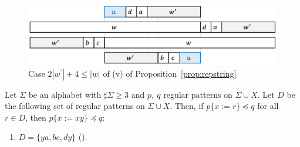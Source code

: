 \begin{figure}[t]
\begin{center}
  \includegraphics[scale=0.345]{figs/w=2w_1+4.pdf}
  \caption{Case $2|w^{\prime}| + 4 \leq |w|$ of (v) of Proposition~\ref{prop:repstring}}\label{fig:prop_pic10}
\end{center}
\end{figure}

\begin{lem}\label{lem:addpart}
  Let $\Sigma$ be an alphabet with $\sharp\Sigma \ge 3$ and $p,~q$ regular patterns on $\Sigma\cup X$.
  Let $D$ be the following set of regular patterns on $\Sigma\cup X$.
  Then, if $p \{ x := r \} \preceq q$ for all $r \in D$, then $p \{ x := xy \} \preceq q$:
  \begin{enumerate}
  \item[] $D = \{ ya, bc, dy \}$ (\TheConditionA).
  \end{enumerate}
\end{lem}


